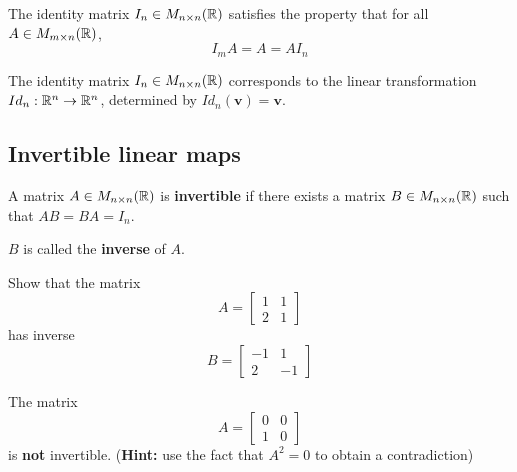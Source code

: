 \begin{proposition}
    The identity matrix $I_n \in M_{n \times n}(\mathbb{R})$ satisfies the property that for all $A \in M_{m \times n}(\mathbb{R})$, $$I_mA = A = AI_n$$
\end{proposition}

\begin{proposition}
    The identity matrix $I_n \in M_{n \times n}(\mathbb{R})$ corresponds to the linear transformation $Id_n : \mathbb{R}^n \to \mathbb{R}^n$, determined by $Id_n (\bm{v}) = \bm{v}$.
\end{proposition}





\subsection{Invertible linear maps}





\begin{definition}
    A matrix $A\in M_{n \times n}(\mathbb{R})$ is \textbf{invertible} if there exists a matrix $B\in M_{n \times n}(\mathbb{R})$ such that $AB = BA = I_n$.
    
    $B$ is called the \textbf{inverse} of $A$.
    \end{definition}

\begin{example}
    Show that the matrix \begin{equation*}
A = 
\begin{bmatrix}
1 & 1 \\
2 & 1
\end{bmatrix}
\end{equation*}
has inverse \begin{equation*}
B = 
\begin{bmatrix}
-1 & 1 \\
2 & -1
\end{bmatrix}
\end{equation*}
\end{example}

\begin{example}
    The matrix  \begin{equation*}
A = 
\begin{bmatrix}
0 & 0 \\
1 & 0
\end{bmatrix}
\end{equation*} is \textbf{not} invertible. (\textbf{Hint:} use the fact that $A^2 = 0$ to obtain a contradiction)
\end{example}

